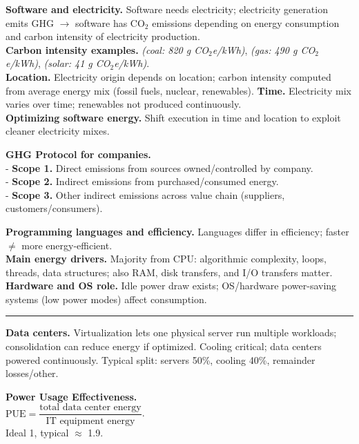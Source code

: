 \documentclass[8pt, a4paper]{extarticle}
\makeatletter
\renewcommand{\hline}{\noalign{\vskip 2px}\hrule\@height\arrayrulewidth\@width\linewidth\noalign{\vskip 2px}}
\makeatother
\begin{document}
\begin{minipage}[t]{0.49\textwidth}
{\begin{minipage}[htp]{1\textwidth}
			\textbf{Software and electricity.} Software needs electricity; electricity generation emits GHG $\rightarrow$ software has CO$_2$ emissions depending on energy consumption and carbon intensity of electricity production.\\
			\textbf{Carbon intensity examples.} \textit{(coal: 820 g CO$_2$e/kWh)}, \textit{(gas: 490 g CO$_2$e/kWh)}, \textit{(solar: 41 g CO$_2$e/kWh)}.\\
			\textbf{Location.} Electricity origin depends on location; carbon intensity computed from average energy mix (fossil fuels, nuclear, renewables). \textbf{Time.} Electricity mix varies over time; renewables not produced continuously.\\
			\textbf{Optimizing software energy.} Shift execution in time and location to exploit cleaner electricity mixes.\\
			\begin{minipage}[t]{0.43\textwidth}
				\textbf{GHG Protocol for companies.}\\
				- \textbf{Scope 1.} Direct emissions from sources owned/controlled by company.\\
				- \textbf{Scope 2.} Indirect emissions from purchased/consumed energy.\\
				- \textbf{Scope 3.} Other indirect emissions across value chain (suppliers, customers/consumers).
			\end{minipage}\hfill\begin{minipage}[t]{0.56\textwidth}
				\textbf{Programming languages and efficiency.} Languages differ in efficiency; faster $\neq$ more energy-efficient.\\
				\textbf{Main energy drivers.} Majority from CPU: algorithmic complexity, loops, threads, data structures; also RAM, disk transfers, and I/O transfers matter.\\
				\textbf{Hardware and OS role.} Idle power draw exists; OS/hardware power-saving systems (low power modes) affect consumption.
			\end{minipage}\hline
			\begin{minipage}[t]{0.58\textwidth}
				\textbf{Data centers.} Virtualization lets one physical server run multiple workloads; consolidation can reduce energy if optimized. Cooling critical; data centers powered continuously. Typical split: servers 50\%, cooling 40\%, remainder losses/other.
			\end{minipage}\hfill\vline\hfill
			\begin{minipage}[t]{0.4\textwidth}
				\textbf{Power Usage Effectiveness.} \\$\mathrm{PUE} = \dfrac{\text{total data center energy}}{\text{IT equipment energy}}$. \\Ideal 1, typical $\approx$ 1.9.

\end{minipage}
\end{minipage}}
\end{minipage}
\end{document}
